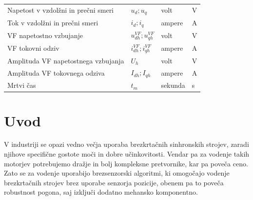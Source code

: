 \documentclass[a4paper,twoside,openright,12pt,slovene]{book}
\begin{document}
\begin{center}
\begin{tabular}{*{4}{l}}
        Napetost v vzdolžni in prečni smeri                        & $u_{d}; u_{q}$                         & volt                 & V                      \\
        Tok v vzdolžni in prečni smeri                             & $i_{d}; i_{q}$                         & ampere               & A                      \\
        VF napetostno vzbujanje                                    & $u^{VF}_{dh}; u^{VF}_{qh}$             & volt                 & V                      \\
        VF tokovni odziv                                           & $i^{VF}_{dh}; i^{VF}_{qh}$             & ampere               & A                      \\
        Amplituda VF napetostnega vzbujanja                        & $U_h$                                  & volt                 & V                      \\
        Amplituda VF tokovnega odziva                              & $I_{dh}; I_{qh}$                       & ampere               & A                      \\
        Mrtvi čas                                                  & $t_m$                                  & sekunda              & s                      \\
    \end{tabular}
\end{center}

\mainmatter




\chapter{Uvod} \label{uvod}

V industriji se opazi vedno večja uporaba brezkrtačnih sinhronskih strojev, zaradi njihove specifične gostote moči in dobre učinkovitosti. Vendar pa za vodenje takih motorjev potrebujemo dražje in
bolj kompleksne pretvornike, kar pa poveča ceno. Zato se za vodenje uporabijo brezsenzorski algoritmi, ki omogočajo vodenje brezkrtačnih strojev brez uporabe senzorja pozicije, obenem pa to poveča
robustnost pogona, saj izključi dodatno mehansko komponentno. 
\end{document}
